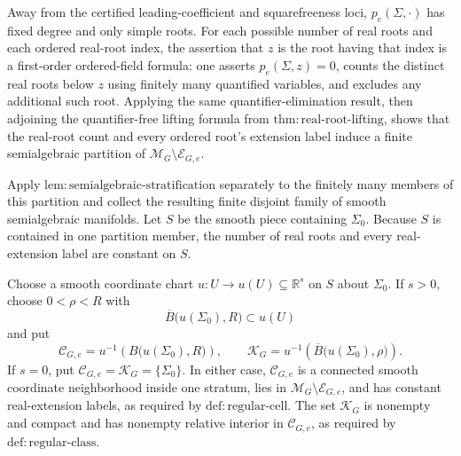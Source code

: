 Away from the certified leading-coefficient and squarefreeness loci, \(p_e(\Sigma,\cdot)\) has fixed degree and only simple roots.  For each possible number of real roots and each ordered real-root index, the assertion that \(z\) is the root having that index is a first-order ordered-field formula: one asserts \(p_e(\Sigma,z)=0\), counts the distinct real roots below \(z\) using finitely many quantified variables, and excludes any additional such root.  Applying the same quantifier-elimination result, then adjoining the quantifier-free lifting formula from \(\mathrm{thm:real\mbox{-}root\mbox{-}lifting}\), shows that the real-root count and every ordered root's extension label induce a finite semialgebraic partition of \(\mathcal M_G\setminus\mathcal E_{G,e}\).

Apply \(\mathrm{lem:semialgebraic\mbox{-}stratification}\) separately to the finitely many members of this partition and collect the resulting finite disjoint family of smooth semialgebraic manifolds.  Let \(S\) be the smooth piece containing \(\Sigma_0\).  Because \(S\) is contained in one partition member, the number of real roots and every real-extension label are constant on \(S\).

Choose a smooth coordinate chart \(u:U\to u(U)\subseteq\mathbb R^s\) on \(S\) about \(\Sigma_0\).  If \(s>0\), choose \(0<\rho<R\) with
\[
 \overline B\bigl(u(\Sigma_0),R\bigr)\subset u(U)
\]
and put
\[
 \mathcal C_{G,e}=u^{-1}\!\left(B\bigl(u(\Sigma_0),R\bigr)\right),
 \qquad
 \mathcal K_G=u^{-1}\!\left(\overline B\bigl(u(\Sigma_0),\rho\bigr)\right).
\tag{7}
\]
If \(s=0\), put \(\mathcal C_{G,e}=\mathcal K_G=\{\Sigma_0\}\).  In either case, \(\mathcal C_{G,e}\) is a connected smooth coordinate neighborhood inside one stratum, lies in \(\mathcal M_G\setminus\mathcal E_{G,e}\), and has constant real-extension labels, as required by \(\mathrm{def:regular\mbox{-}cell}\).  The set \(\mathcal K_G\) is nonempty and compact and has nonempty relative interior in \(\mathcal C_{G,e}\), as required by \(\mathrm{def:regular\mbox{-}class}\).

